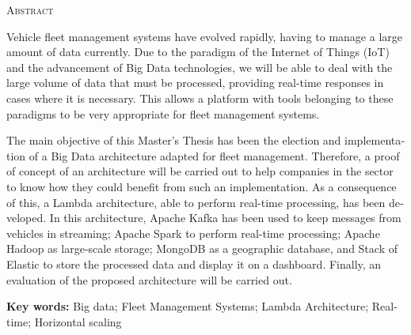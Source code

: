 \begin{otherlanguage}{english}

\textsc{\noindent\LARGE Abstract}

Vehicle fleet management systems have evolved rapidly, having to
manage a large amount of data currently. Due to the paradigm of the
Internet of Things (IoT) and the advancement of Big Data technologies,
we will be able to deal with the large volume of data that must be
processed, providing real-time responses in cases where it is
necessary. This allows a platform with tools belonging to these
paradigms to be very appropriate for fleet management systems.

The main objective of this Master's Thesis has been the election and
implementation of a Big Data architecture adapted for fleet
management. Therefore, a proof of concept of an architecture will be
carried out to help companies in the sector to know how they could
benefit from such an implementation. As a consequence of this, a
Lambda architecture, able to perform real-time processing, has been
developed. In this architecture, Apache Kafka has been used to keep
messages from vehicles in streaming; Apache Spark to perform
real-time processing; Apache Hadoop as large-scale storage; MongoDB
as a geographic database, and Stack of Elastic to store the processed
data and display it on a dashboard. Finally, an evaluation of the
proposed architecture will be carried out.

\hfill \break
\textbf{Key  words:} Big data; Fleet Management Systems; Lambda Architecture; Real-time; Horizontal scaling

\end{otherlanguage}

